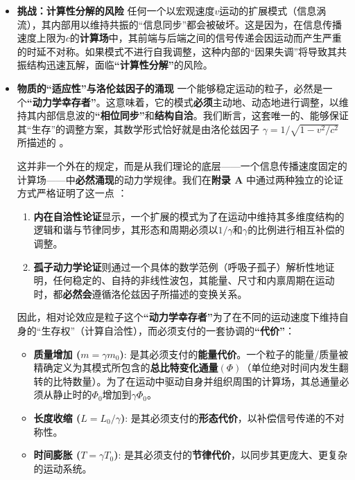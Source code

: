 \documentclass[11pt, a4paper]{article}
\begin{document}
\begin{itemize}
    \item \textbf{挑战：计算性分解的风险}
    任何一个以宏观速度$v$运动的扩展模式（信息涡流），其内部用以维持共振的“信息同步”都会被破坏。这是因为，在信息传播速度上限为$c$的\textbf{计算场}中，其前端与后端之间的信号传递会因运动而产生严重的时延不对称。如果模式不进行自我调整，这种内部的“因果失调”将导致其共振结构迅速瓦解，面临\textbf{“计算性分解”}的风险。

    \item \textbf{物质的“适应性”与洛伦兹因子的涌现}
    一个能够稳定运动的粒子，必然是一个\textbf{“动力学幸存者”}。这意味着，它的模式\textbf{必须}主动地、动态地进行调整，以维持其内部信息波的\textbf{“相位同步”}和\textbf{结构自洽}。我们断言，这套唯一的、能够保证其“生存”的调整方案，其数学形式恰好就是由洛伦兹因子 $\gamma = 1 / \sqrt{1 - v^2/c^2}$ 所描述的 \cite{Einstein1905}。

    这并非一个外在的规定，而是从我们理论的底层——一个信息传播速度固定的计算场——中\textbf{必然涌现}的动力学规律。我们在\textbf{附录 A} 中通过两种独立的论证方式严格证明了这一点 \cite{DrazinJohnson1989}：
    \begin{enumerate}
        \item \textbf{内在自洽性论证}显示，一个扩展的模式为了在运动中维持其多维度结构的逻辑和谐与节律同步，其形态和周期必须以$1/\gamma$和$\gamma$的比例进行相互补偿的调整。
        \item \textbf{孤子动力学论证}则通过一个具体的数学范例（呼吸子孤子）解析性地证明，任何稳定的、自持的非线性波包，其能量、尺寸和内禀周期在运动时，都\textbf{必然会}遵循洛伦兹因子所描述的变换关系。
    \end{enumerate}

    因此，相对论效应是粒子这个\textbf{“动力学幸存者”}为了在不同的运动速度下维持自身的“生存权”（计算自洽性），而必须支付的一套协调的\textbf{“代价”}：
    \begin{itemize}
        \item \textbf{质量增加 ($m = \gamma m_0$)}: 是其必须支付的\textbf{能量代价}。一个粒子的能量/质量被精确定义为其模式所包含的\textbf{总比特变化通量}$(\Phi)$（单位绝对时间内发生翻转的比特数量）。为了在运动中驱动自身并组织周围的计算场，其总通量必须从静止时的$\Phi_0$增加到$\gamma\Phi_0$。
        \item \textbf{长度收缩 ($L = L_0/\gamma$)}: 是其必须支付的\textbf{形态代价}，以补偿信号传递的不对称性。
        \item \textbf{时间膨胀 ($T = \gamma T_0$)}: 是其必须支付的\textbf{节律代价}，以同步其更庞大、更复杂的运动系统。
    \end{itemize}
\end{itemize}
\end{document}
